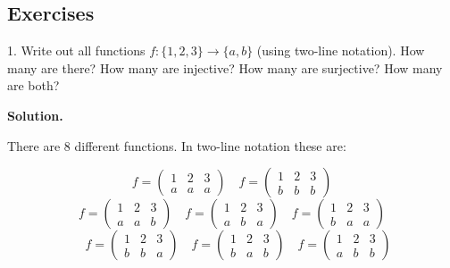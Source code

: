 \documentclass[10pt,]{book}
\theoremstyle{plain}
\theoremstyle{definition}
\theoremstyle{definition}
\theoremstyle{definition}
\numberwithin{equation}{section}
\newcommand{\amp}{ & }
\begin{document}
\subsection[Exercises]{Exercises}\label{exercises-3}
\begin{exerciselist}
\item[1.]\hypertarget{exercise-27}{}
            Write out all functions \(f: \{1,2,3\} \to \{a,b\}\) (using two-line notation). How many are there? How many are injective? How many are surjective? How many are both?
\par\smallskip
\par\smallskip
\noindent\textbf{Solution.}\hypertarget{solution-45}{}\quad

            There are 8 different functions. In two-line notation these are:

            
              \begin{equation*} f = \begin{pmatrix} 1 \amp 2 \amp 3 \\ a \amp a\amp a \end{pmatrix} \quad f = \begin{pmatrix} 1 \amp 2 \amp 3 \\ b \amp b \amp b \end{pmatrix}\end{equation*}
              \begin{equation*} f = \begin{pmatrix} 1 \amp 2 \amp 3 \\ a \amp a\amp b \end{pmatrix} \quad f = \begin{pmatrix} 1 \amp 2 \amp 3 \\ a \amp b \amp a \end{pmatrix} \quad f = \begin{pmatrix} 1 \amp 2 \amp 3 \\ b \amp a\amp a \end{pmatrix}
              \end{equation*}
              \begin{equation*}
                \quad f = \begin{pmatrix} 1 \amp 2 \amp 3 \\ b \amp b \amp a \end{pmatrix} \quad f = \begin{pmatrix} 1 \amp 2 \amp 3 \\ b \amp a\amp b \end{pmatrix} \quad f = \begin{pmatrix} 1 \amp 2 \amp 3 \\ a \amp b \amp b \end{pmatrix} \end{equation*}


\end{exerciselist}
\end{document}

